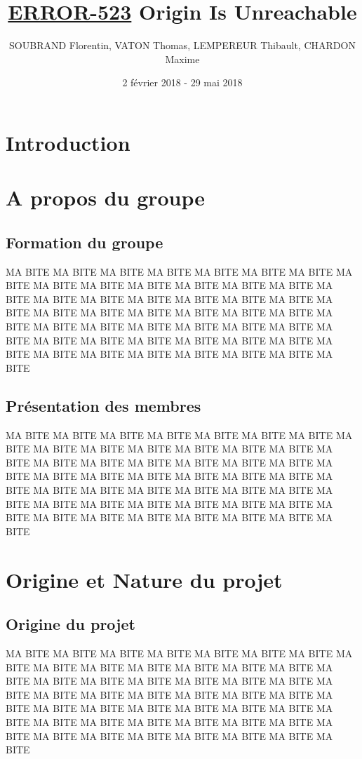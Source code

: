 \documentclass[12pt,a4paper]{article}
\title{\textbf { \huge{\underline{ERROR-523}} \bigbreak  \large{Origin Is Unreachable}}}
\author{SOUBRAND Florentin, VATON Thomas, LEMPEREUR Thibault, CHARDON Maxime}
\date {2 février 2018 - 29 mai 2018}
\begin{document}
\pagestyle{fancy}




\newpage
\thispagestyle{empty}
\tableofcontents

\newpage

\section{Introduction}


\newpage
\section {A propos du groupe}
\subsection{Formation du groupe}
MA BITE MA BITE MA BITE MA BITE MA BITE MA BITE MA BITE MA BITE MA BITE MA BITE 
MA BITE MA BITE MA BITE MA BITE MA BITE MA BITE MA BITE MA BITE MA BITE MA BITE 
MA BITE MA BITE MA BITE MA BITE MA BITE MA BITE MA BITE MA BITE MA BITE MA BITE 
MA BITE MA BITE MA BITE MA BITE MA BITE MA BITE MA BITE MA BITE MA BITE MA BITE 
MA BITE MA BITE MA BITE MA BITE MA BITE MA BITE MA BITE MA BITE MA BITE MA BITE 
\subsection{Présentation des membres}
MA BITE MA BITE MA BITE MA BITE MA BITE MA BITE MA BITE MA BITE MA BITE MA BITE 
MA BITE MA BITE MA BITE MA BITE MA BITE MA BITE MA BITE MA BITE MA BITE MA BITE 
MA BITE MA BITE MA BITE MA BITE MA BITE MA BITE MA BITE MA BITE MA BITE MA BITE 
MA BITE MA BITE MA BITE MA BITE MA BITE MA BITE MA BITE MA BITE MA BITE MA BITE 
MA BITE MA BITE MA BITE MA BITE MA BITE MA BITE MA BITE MA BITE MA BITE MA BITE 

\newpage
\section{Origine et Nature du projet}
\subsection{Origine du projet}
MA BITE MA BITE MA BITE MA BITE MA BITE MA BITE MA BITE MA BITE MA BITE MA BITE 
MA BITE MA BITE MA BITE MA BITE MA BITE MA BITE MA BITE MA BITE MA BITE MA BITE 
MA BITE MA BITE MA BITE MA BITE MA BITE MA BITE MA BITE MA BITE MA BITE MA BITE 
MA BITE MA BITE MA BITE MA BITE MA BITE MA BITE MA BITE MA BITE MA BITE MA BITE 
MA BITE MA BITE MA BITE MA BITE MA BITE MA BITE MA BITE MA BITE MA BITE MA BITE 
\end{document}
